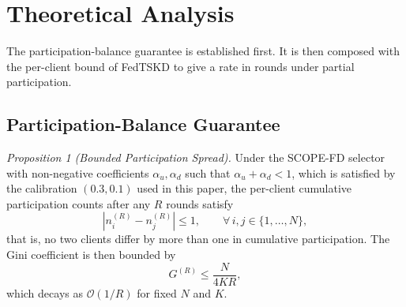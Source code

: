 \documentclass[journal]{IEEEtran}
\newcommand{\rev}[1]{{\color{blue}#1}}
\begin{document}
\section{Theoretical Analysis}
\label{sec:theory}

The participation-balance guarantee is established first. \rev{It is then composed with the per-client bound of FedTSKD \cite{mu2024fedtskd} to give a rate in rounds under partial participation.}

\subsection{Participation-Balance Guarantee}
\label{ssec:participation-balance}

\textit{Proposition 1 (Bounded Participation Spread).} Under the SCOPE-FD selector with non-negative coefficients $\alpha_u, \alpha_d$ such that $\alpha_u + \alpha_d < 1$, which is satisfied by the calibration $(0.3, 0.1)$ used in this paper, the per-client cumulative participation counts after any $R$ rounds satisfy
\begin{equation}
\left| n_i^{(R)} - n_j^{(R)} \right| \le 1, \qquad \forall\, i,j \in \{1,\dots,N\},
\label{eq:spread}
\end{equation}
that is, no two clients differ by more than one in cumulative participation. The Gini coefficient is then bounded by
\begin{equation}
G^{(R)} \le \frac{N}{4KR},
\label{eq:gini_bound}
\end{equation}
which decays as $\mathcal{O}(1/R)$ for fixed $N$ and $K$.
\end{document}
